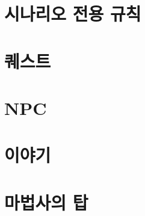 \documentclass{report}
\begin{document}
	\hypertarget{scenario-rule}{}
	\section{시나리오 전용 규칙}
	
	\hypertarget{quest}{}
	\section{퀘스트}
	
	\hypertarget{npc}{}
	\section{NPC}
	
	\hypertarget{tower-story}{}
	\section{이야기}
	
	\hypertarget{tower-of-wizard}{}
	\section{마법사의 탑}
	
\end{document}
